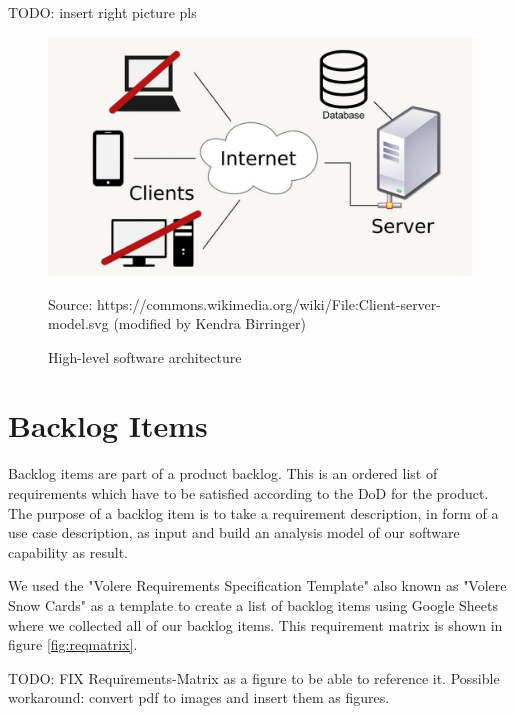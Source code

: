 \documentclass[a4paper, 12pt]{article}
\newcommand{\source}[1]{\caption*{Source: {#1}}}
\begin{document}
\color{red}TODO: insert right picture pls \color{black}
\begin{figure} [htbp]
  \begin{center}
    \includegraphics[scale=0.225]{images/high-level-system-architecture.jpg}
  \end{center}
  \caption{High-level software architecture}
  \source{https://commons.wikimedia.org/wiki/File:Client-server-model.svg (modified by Kendra Birringer)}
\end{figure}
\newpage
\section{Backlog Items}
Backlog items are part of a product backlog. This is an ordered list of requirements which have to be satisfied according to the DoD for the product. The purpose of a backlog item is to take a requirement description, in form of a use case description, as input and build an analysis model of our software capability as result.

We used the "Volere Requirements Specification Template" \cite{volere} also known as "Volere Snow Cards"  as a template to create a list of backlog items using Google Sheets where we collected all of our backlog items. This requirement matrix is shown in figure \ref{fig:reqmatrix}.

\color{red}TODO: FIX Requirements-Matrix as a figure to be able to reference it.
Possible workaround: convert pdf to images and insert them as figures.
\color{black}

\label{fig:reqmatrix}

\end{document}
